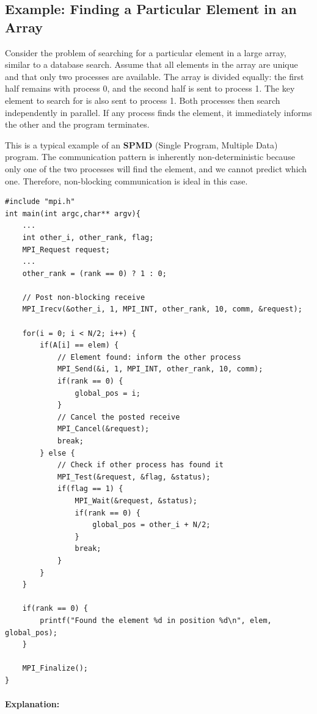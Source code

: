 \documentclass[12pt]{book}
\begin{document}
\subsection{Example: Finding a Particular Element in an Array}

Consider the problem of searching for a particular element in a large array, similar to a database search. Assume that all elements in the array are unique and that only two processes are available. The array is divided equally: the first half remains with process 0, and the second half is sent to process 1. The key element to search for is also sent to process 1. Both processes then search independently in parallel. If any process finds the element, it immediately informs the other and the program terminates.

This is a typical example of an \textbf{SPMD} (Single Program, Multiple Data) program. The communication pattern is inherently non-deterministic because only one of the two processes will find the element, and we cannot predict which one. Therefore, non-blocking communication is ideal in this case.

\begin{lstlisting}[style=cppstyle]
#include "mpi.h"
int main(int argc,char** argv){
    ...
    int other_i, other_rank, flag;
    MPI_Request request;
    ...
    other_rank = (rank == 0) ? 1 : 0;

    // Post non-blocking receive
    MPI_Irecv(&other_i, 1, MPI_INT, other_rank, 10, comm, &request);

    for(i = 0; i < N/2; i++) {
        if(A[i] == elem) {
            // Element found: inform the other process
            MPI_Send(&i, 1, MPI_INT, other_rank, 10, comm);
            if(rank == 0) {
                global_pos = i;
            }
            // Cancel the posted receive
            MPI_Cancel(&request);
            break;
        } else {
            // Check if other process has found it
            MPI_Test(&request, &flag, &status);
            if(flag == 1) {
                MPI_Wait(&request, &status);
                if(rank == 0) {
                    global_pos = other_i + N/2;
                }
                break;
            }
        }
    }

    if(rank == 0) {
        printf("Found the element %d in position %d\n", elem, global_pos);
    }

    MPI_Finalize();
}
\end{lstlisting}

\paragraph{Explanation:}
\end{document}
